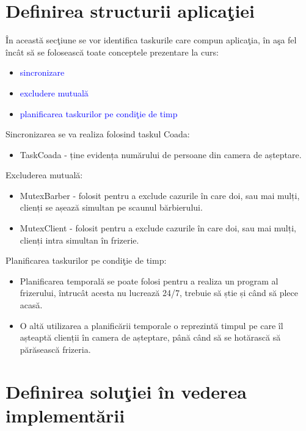 \documentclass[a4paper, 11pt]{article}
\begin{document}
\section{Definirea structurii aplica\c{t}iei}

\^{I}n aceast\u{a} sec\c{t}iune se vor identifica taskurile care compun aplica\c{t}ia, \^{i}n a\c{s}a fel \^{i}nc\^{a}t s\u{a} se foloseasc\u{a} toate conceptele prezentare la curs: 

\begin{itemize}
\item \textcolor{blue}{sincronizare}
\item \textcolor{blue}{excludere mutual\u{a}}
\item \textcolor{blue}{planificarea taskurilor pe condi\c{t}ie de timp}
\end{itemize}

Sincronizarea se va realiza folosind taskul Coada:
\begin{itemize}
\item TaskCoada - ține evidența numărului de persoane din camera de așteptare.
\end{itemize}

Excluderea mutuală:
\begin{itemize}
\item MutexBarber   - folosit pentru a exclude cazurile în care doi, sau mai mulți, clienți se așează simultan pe scaunul bărbierului. 
\item MutexClient   - folosit pentru a exclude cazurile în care doi, sau mai mulți, clienți intra simultan în frizerie. 
\end{itemize}

Planificarea taskurilor pe condi\c{t}ie de timp:
\begin{itemize}
\item Planificarea temporală se poate folosi pentru a realiza un program al frizerului, întrucât acesta nu lucrează 24/7, trebuie să știe și când să plece acasă.
\item O altă utilizarea a planificării temporale o reprezintă timpul pe care îl așteaptă clienții în camera de așteptare, până când să se hotărască să părăsească frizeria.
\end{itemize}



\section{Definirea solu\c{t}iei \^{i}n vederea implement\u{a}rii}
\end{document}
